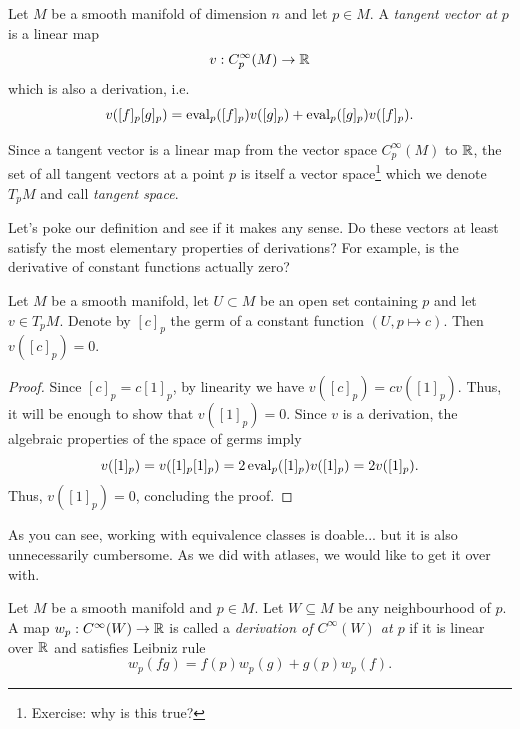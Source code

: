 \begin{definition}
	Let $M$ be a smooth manifold of dimension $n$ and let $p\in M$.
	A \emph{tangent vector at $p$} is a linear map
	\begin{equation}\label{def:tangentvector}
		v: C_p^\infty(M)\to\mathbb{R}
	\end{equation}
	which is also a derivation, i.e.
	\begin{equation}
		v([f]_p [g]_p) =
		\operatorname{eval}_p([f]_p)v([g]_p)
		+ \operatorname{eval}_p([g]_p)v([f]_p).
	\end{equation}

	Since a tangent vector is a linear map from the vector space $C_p^\infty(M)$ to $\mathbb{R}$, the set of all tangent vectors at a point $p$ is itself a vector space\footnote{Exercise: why is this true?} which we denote $T_p M$ and call \emph{tangent space}.
\end{definition}

Let's poke our definition and see if it makes any sense.
Do these vectors at least satisfy the most elementary properties of derivations?
For example, is the derivative of constant functions actually zero?

\begin{lemma}\label{lem:f'0is0forconst}
	Let $M$ be a smooth manifold, let $U\subset M$ be an open set containing $p$ and let $v\in T_p M$.
	Denote by $[c]_p$ the germ of a constant function $(U, p \mapsto c)$.
	Then $v([c]_p) = 0$.
\end{lemma}
\begin{proof}
	Since $[c]_p = c [1]_p$, by linearity we have $v([c]_p) = c v([1]_p)$.
	Thus, it will be enough to show that $v([1]_p) = 0$.
	Since $v$ is a derivation, the algebraic properties of the space of germs imply
	\begin{equation}
		v([1]_p) = v([1]_p [1]_p) = 2 \operatorname{eval}_p([1]_p)v([1]_p) = 2 v([1]_p).
	\end{equation}
	Thus, $v([1]_p) = 0$, concluding the proof.
\end{proof}

As you can see, working with equivalence classes is doable... but it is also unnecessarily cumbersome.
As we did with atlases, we would like to get it over with.

\begin{definition}
	Let $M$ be a smooth manifold and $p\in M$.
	Let $W\subseteq M$ be any neighbourhood of $p$.
	A map $w_p:C^\infty(W)\to\mathbb{R}$ is called a \emph{derivation of $C^\infty(W)$ at $p$} if it is linear over $\mathbb{R}$ and satisfies Leibniz rule
	\begin{equation}
		w_p(fg) = f(p)w_p(g) + g(p)w_p(f).
	\end{equation}
\end{definition}

